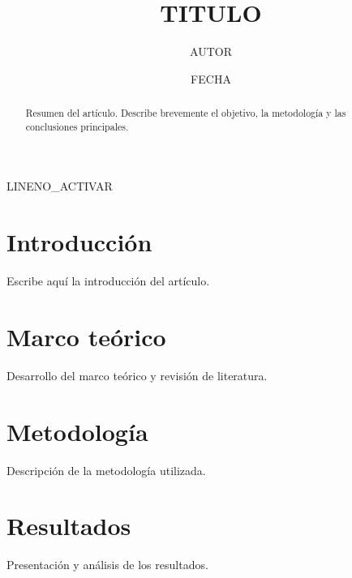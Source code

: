 \documentclass[12pt, a4paper]{article}
\title{{{TITULO}}}
\author{{{AUTOR}}}
\date{{{FECHA}}}
\theoremstyle{definition}
\theoremstyle{plain}
\begin{document}
\maketitle

\begin{abstract}
  Resumen del artículo. Describe brevemente el objetivo, la metodología
  y las conclusiones principales.
\end{abstract}

\tableofcontents
\newpage

{{LINENO_ACTIVAR}}

\section{Introducción}

Escribe aquí la introducción del artículo.

\section{Marco teórico}

Desarrollo del marco teórico y revisión de literatura.

\section{Metodología}

Descripción de la metodología utilizada.

\section{Resultados}

Presentación y análisis de los resultados.

\end{document}
